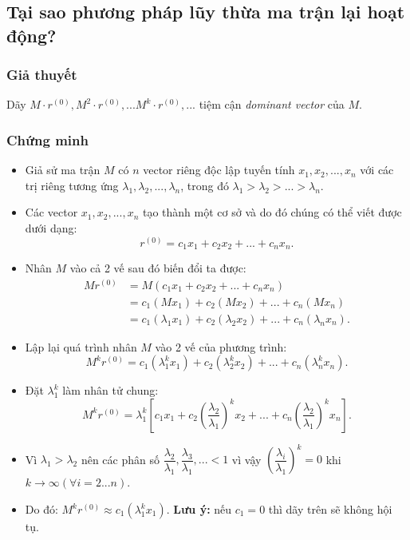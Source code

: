 \subsection{Tại sao phương pháp lũy thừa ma trận lại hoạt động? \cite{Leskovec_Rajaraman_Ullman_2022}}
        \subsubsection{Giả thuyết} 
        Dãy $M \cdot r^{(0)}, M^2 \cdot r^{(0)},...M^k \cdot r^{(0)},... $ tiệm cận \emph{dominant vector} của $M$. 
        \subsubsection{Chứng minh}
        \begin{itemize}
            \item Giả sử ma trận $M$ có $n$ vector riêng độc lập tuyến tính $x_1, x_2,..., x_n$ với các trị riêng tương ứng $\lambda_1, \lambda_2,..., \lambda_n$, trong đó  $\lambda_1 > \lambda_2 >...> \lambda_n.$
            \item Các vector $x_1, x_2,..., x_n$ tạo thành một cơ sở và do đó chúng có thể viết được dưới dạng: $$r^{(0)} = c_1x_1 + c_2x_2 + ... + c_nx_n.$$
            \item Nhân $M$ vào cả 2 vế sau đó biến đổi ta được:
            \begin{align*}
                Mr^{(0)} &= M(c_1x_1 + c_2x_2 + ... + c_nx_n)\\
                &= c_1(Mx_1) + c_2(Mx_2) +...+ c_n(Mx_n) \\
                &= c_1(\lambda_1 x_1) + c_2(\lambda_2 x_2) +...+ c_n(\lambda_n x_n).
            \end{align*}
            
            
            \item Lập lại quá trình nhân $M$ vào 2 vế của phương trình:
            $$M^kr^{(0)} = c_1(\lambda_1^k x_1) + c_2(\lambda_2^k  x_2) +...+ c_n(\lambda_n^k x_n).$$
            \item Đặt $\lambda_1^k$ làm nhân tử chung:
            $$M^kr^{(0)} = \lambda_1^k \left[ c_1x_1 + c_2\left(\dfrac{\lambda_2}{\lambda_1}\right)^k  x_2 +...+ c_n\left(\dfrac{\lambda_2}{\lambda_1}\right)^k x_n\right].$$
            \item Vì $\lambda_1 > \lambda_2$ nên các phân số $\dfrac{\lambda_2}{\lambda_1},\dfrac{\lambda_3}{\lambda_1},... < 1$ vì vậy $\left(\dfrac{\lambda_i}{\lambda_1}\right)^k = 0$ khi $k \rightarrow \infty (\forall i = 2...n).$ 
            \item Do đó: $M^k r^{(0)} \approx c_1(\lambda_1^kx_1).$
            \textbf{Lưu ý:} nếu $c_1 = 0$ thì dãy trên sẽ không hội tụ.
        \end{itemize}
        
       